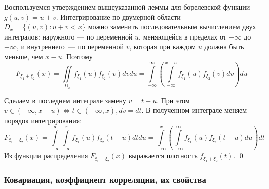 \documentclass[oneside,final,14pt]{extreport}
\renewenvironment{proof}{{\bfseries Доказательство.}}{\qed}
\theoremstyle{plain}
\theoremstyle{definition}
\theoremstyle{named}
\begin{document}
\begin{proof}
    Воспользуемся утверждением вышеуказанной леммы для борелевской функции $g(u, v)=u+v$. Интегрирование по двумерной области $D_{x}=\{(u, v) \colon u+v<x\}$ можно заменить последовательным вычислением двух интегралов: наружного — по переменной $u$, меняющейся в пределах от $-\infty$ до $+\infty$, и внутреннего~--- по переменной $v$, которая при каждом $u$ должна быть меньше, чем $x-u$. Поэтому
    \begin{equation*}
        F_{\xi_{1}+\xi_{2}}(x)=\iint\limits_{D_{x}} f_{\xi_{1}}(u) f_{\xi_{2}}(v) d v d u=\int\limits_{-\infty}^{\infty}\left(\int\limits_{-\infty}^{x-u} f_{\xi_{1}}(u) f_{\xi_{2}}(v) d v\right) d u
    \end{equation*}
    
    Сделаем в последнем интеграле замену $v=t-u$. При этом $v \in(-\infty, x-u) \Leftrightarrow t \in(-\infty, x), d v=d t$. В полученном интеграле меняем порядок интегрирования:
    \begin{equation*}
        F_{\xi_{1}+\xi_{2}}(x)=\int\limits_{-\infty}^{\infty} \int\limits_{-\infty}^{x} f_{\xi_{1}}(u) f_{\xi_{2}}(t-u) d t d u=\int\limits_{-\infty}^{x}\left(\int\limits_{-\infty}^{\infty} f_{\xi_{1}}(u) f_{\xi_{2}}(t-u) d u\right) d t
    \end{equation*}
    Из функции распределения $F_{\xi_{1}+\xi_{2}}(x)$ выражается плотность $f_{\xi_{1}+\xi_{2}}(t)$.
\end{proof}

\subsubsection{Ковариация, коэффициент корреляции, их свойства}
\end{document}

